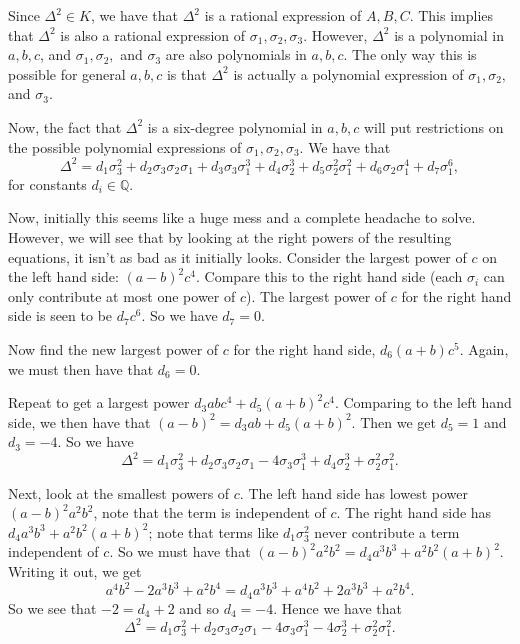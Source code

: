 Since \(\Delta^2 \in K\), we have that \(\Delta^2\) is a rational expression of \(A, B, C\). This implies
that \(\Delta^2\) is also a rational expression of \(\sigma_1, \sigma_2, \sigma_3\). However, \(\Delta^2\)
is a polynomial in \(a, b, c\), and \(\sigma_1, \sigma_2,\) and \(\sigma_3\) are also polynomials in
\(a, b, c\). The only way this is possible for general \(a, b, c\) is that \(\Delta^2\) is
actually a polynomial expression of \(\sigma_1, \sigma_2,\) and \(\sigma_3\).

Now, the fact that \(\Delta^2\) is a six-degree polynomial in \(a, b, c\) will put restrictions on the 
possible polynomial expressions of \(\sigma_1, \sigma_2, \sigma_3\). We have that
\begin{equation}
\Delta^2 = d_1 \sigma_3^2 + d_2 \sigma_3 \sigma_2 \sigma_1 + d_3 \sigma_3 \sigma_1^3
    + d_4 \sigma_2^3 + d_5 \sigma_2^2 \sigma_1^2 + d_6 \sigma_2 \sigma_1^4 + d_7 \sigma_1^6,
\end{equation}
for constants \(d_i \in \mathbb Q\).

Now, initially this seems like a huge mess and a complete headache to solve. However, we will see that by looking
at the right powers of the resulting equations, it isn't as bad as it initially looks.
Consider the largest power of \(c\) on the left hand side: \((a-b)^2 c^4\). Compare this to the right
hand side (each \(\sigma_i\) can only contribute at most one power of \(c\)).
The largest power of \(c\) for the right hand side is seen to be \(d_7 c^6\). So we have \(d_7 = 0\).

Now find the new largest power of \(c\) for the right hand side, \(d_6 (a + b)c^5\). Again, we must then
have that \(d_6 = 0\).

Repeat to get a largest power \(d_3 abc^4 + d_5 (a + b)^2 c^4\). Comparing to the left
hand side, we then have that \((a - b)^2 = d_3 ab + d_5 (a + b)^2\). Then we get \(d_5 = 1\)
and \(d_3 = -4\).
So we have
\begin{equation}
\Delta^2 = d_1 \sigma_3^2 + d_2 \sigma_3 \sigma_2 \sigma_1 
    - 4 \sigma_3 \sigma_1^3 + d_4 \sigma_2^3 + \sigma_2^2 \sigma_1^2.
\end{equation}

Next, look at the smallest powers of \(c\). The left hand side has lowest power \((a-b)^2a^2b^2\), note
that the term is independent of \(c\). The right hand side has \(d_4 a^3b^3 + a^2b^2(a + b)^2\); note that
terms like \(d_1 \sigma_3^2\) never contribute a term independent of \(c\). So we
must have that \((a-b)^2a^2b^2 = d_4 a^3b^3 + a^2b^2(a + b)^2\). Writing it out, we get
\begin{equation}
a^4b^2 - 2a^3b^3 + a^2b^4 = d_4 a^3b^3 + a^4b^2 + 2a^3b^3 + a^2b^4.
\end{equation}
So we see that \(-2 = d_4 + 2\) and so \(d_4 = -4\). Hence we have that
\begin{equation}
\Delta^2 = d_1 \sigma_3^2 + d_2 \sigma_3 \sigma_2 \sigma_1 
    - 4 \sigma_3 \sigma_1^3 - 4 \sigma_2^3 + \sigma_2^2 \sigma_1^2.
\end{equation}

